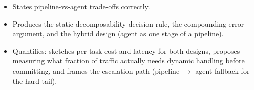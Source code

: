\begin{interviewq}

\goodgreat
\begin{itemize}
    \item {} States pipeline-vs-agent trade-offs correctly.
    \item {} Produces the static-decomposability decision rule, the compounding-error argument, and the hybrid design (agent as one stage of a pipeline).
    \item {} Quantifies: sketches per-task cost and latency for both designs, proposes measuring what fraction of traffic actually needs dynamic handling before committing, and frames the escalation path (pipeline $\rightarrow$ agent fallback for the hard tail).
\end{itemize}

\end{interviewq}


